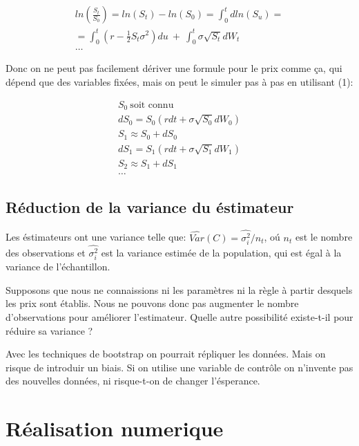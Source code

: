 \documentclass[a4paper,12pt]{scrartcl}
\begin{document}
\begin{equation} \label{5}
\begin{multlined}
ln( \frac{S_t}{S_0} ) = ln(S_t)-ln(S_0) = \int_0^t dln(S_u) = \\
= \int_0^t (r-\frac{1}{2} S_t \sigma^2)du~+~\int_0^t \sigma \sqrt{S_t}dW_t \\
\dots
\end{multlined}
\end{equation}

Donc on ne peut pas facilement dériver une formule pour le prix comme ça, qui dépend que des variables fixées, mais on peut le simuler pas à pas en utilisant (1):

\begin{equation} \label{6}
\begin{multlined}
S_0 ~\text{soit connu} \\
dS_0 = S_0(rdt + \sigma \sqrt{S_0} dW_0) \\
S_1 \approx S_0 + dS_0 \\
dS_1 = S_1(rdt + \sigma \sqrt{S_1} dW_1) \\
S_2 \approx S_1 + dS_1 \\
\dots
\end{multlined}
\end{equation}



\subsection{Réduction de la variance du éstimateur}

Les éstimateurs ont une variance telle que:
$ \hat{Var}(C) = \hat{\sigma_i^2} / n_t$, oú $n_t$ est le nombre des observations et $\hat{\sigma_i^2}$ est la variance estimée de la population, qui est égal à la variance de l'échantillon.

Supposons que nous ne connaissions ni les paramètres ni la règle à partir desquels les prix sont établis. 
Nous ne pouvons donc pas augmenter le nombre d'observations pour améliorer l'estimateur.
Quelle autre possibilité existe-t-il pour réduire sa variance ?

Avec les techniques de bootstrap on pourrait répliquer les données. 
Mais on risque de introduir un biais.
Si on utilise une variable de contrôle on n'invente pas des nouvelles données, ni risque-t-on de changer l'ésperance.


\section{Réalisation numerique}
\end{document}
